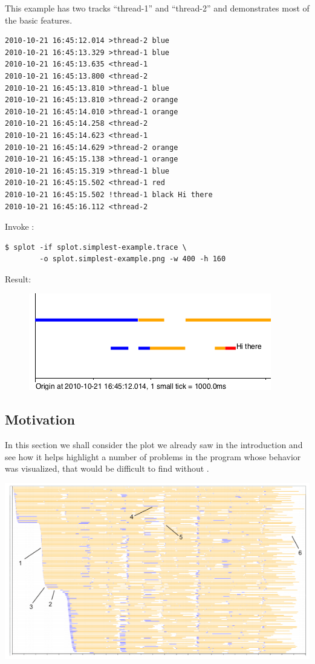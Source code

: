 \documentclass{article}
\begin{document}
This example has two tracks ``thread-1'' and ``thread-2'' and demonstrates most of the basic features.

\begin{verbatim}
2010-10-21 16:45:12.014 >thread-2 blue
2010-10-21 16:45:13.329 >thread-1 blue
2010-10-21 16:45:13.635 <thread-1
2010-10-21 16:45:13.800 <thread-2
2010-10-21 16:45:13.810 >thread-1 blue
2010-10-21 16:45:13.810 >thread-2 orange
2010-10-21 16:45:14.010 >thread-1 orange
2010-10-21 16:45:14.258 <thread-2
2010-10-21 16:45:14.623 <thread-1
2010-10-21 16:45:14.629 >thread-2 orange
2010-10-21 16:45:15.138 >thread-1 orange
2010-10-21 16:45:15.319 >thread-1 blue
2010-10-21 16:45:15.502 <thread-1 red
2010-10-21 16:45:15.502 !thread-1 black Hi there
2010-10-21 16:45:16.112 <thread-2
\end{verbatim}

Invoke \splot{}:
\begin{verbatim}
$ splot -if splot.simplest-example.trace \
        -o splot.simplest-example.png -w 400 -h 160
\end{verbatim}

Result:
\begin{figure}[h]
\center
\includegraphics[scale=0.5]{pics/splot/splot-simplest-example.png}
\end{figure}

\pagebreak
\subsection{Motivation}
\label{sec:splot-motivation}
In this section we shall consider the plot we already saw in the introduction and see how it helps highlight a number of problems in the program whose behavior was visualized, that would be difficult to find without \splot{}.

{
\center
\includegraphics[width=\textwidth]{pics/splot/splot-main-example-analyzed.png}
}
\end{document}
